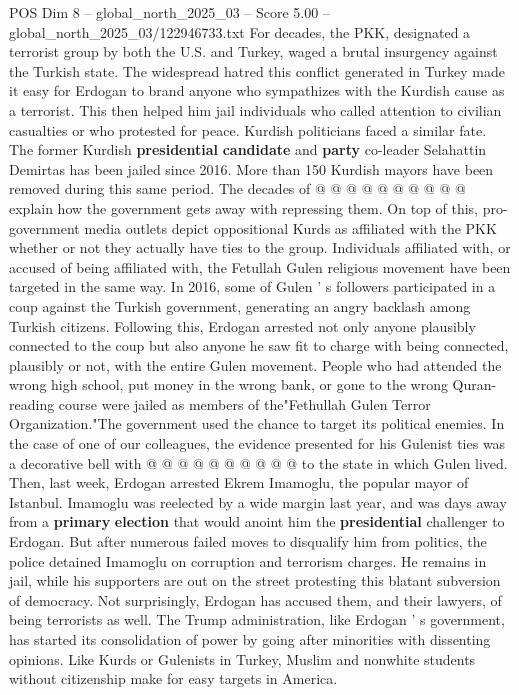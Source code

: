 \begin{textsample}{POS Dim 8 – global\_north\_2025\_03 – Score 5.00 – global\_north\_2025\_03/122946733.txt}
For decades, the PKK, designated a terrorist group by both the U.S. and Turkey, waged a brutal insurgency against the Turkish state.
The widespread hatred this conflict generated in Turkey made it easy for Erdogan to brand anyone who sympathizes with the Kurdish cause as a terrorist.
This then helped him jail individuals who called attention to civilian casualties or who protested for peace.
Kurdish politicians faced a similar fate.
The former Kurdish \textbf{presidential} \textbf{candidate} and \textbf{party} co-leader Selahattin Demirtas has been jailed since 2016.
More than 150 Kurdish mayors have been removed during this same period.
The decades of @ @ @ @ @ @ @ @ @ @ explain how the government gets away with repressing them.
On top of this, pro-government media outlets depict oppositional Kurds as affiliated with the PKK whether or not they actually have ties to the group.
Individuals affiliated with, or accused of being affiliated with, the Fetullah Gulen religious movement have been targeted in the same way.
In 2016, some of Gulen ' s followers participated in a coup against the Turkish government, generating an angry backlash among Turkish citizens.
Following this, Erdogan arrested not only anyone plausibly connected to the coup but also anyone he saw fit to charge with being connected, plausibly or not, with the entire Gulen movement.
People who had attended the wrong high school, put money in the wrong bank, or gone to the wrong Quran-reading course were jailed as members of the"Fethullah Gulen Terror Organization."The government used the chance to target its political enemies.
In the case of one of our colleagues, the evidence presented for his Gulenist ties was a decorative bell with @ @ @ @ @ @ @ @ @ @ to the state in which Gulen lived.
Then, last week, Erdogan arrested Ekrem Imamoglu, the popular mayor of Istanbul.
Imamoglu was reelected by a wide margin last year, and was days away from a \textbf{primary} \textbf{election} that would anoint him the \textbf{presidential} challenger to Erdogan.
But after numerous failed moves to disqualify him from politics, the police detained Imamoglu on corruption and terrorism charges.
He remains in jail, while his supporters are out on the street protesting this blatant subversion of democracy.
Not surprisingly, Erdogan has accused them, and their lawyers, of being terrorists as well.
The Trump administration, like Erdogan ' s government, has started its consolidation of power by going after minorities with dissenting opinions.
Like Kurds or Gulenists in Turkey, Muslim and nonwhite students without citizenship make for easy targets in America.

\end{textsample}
